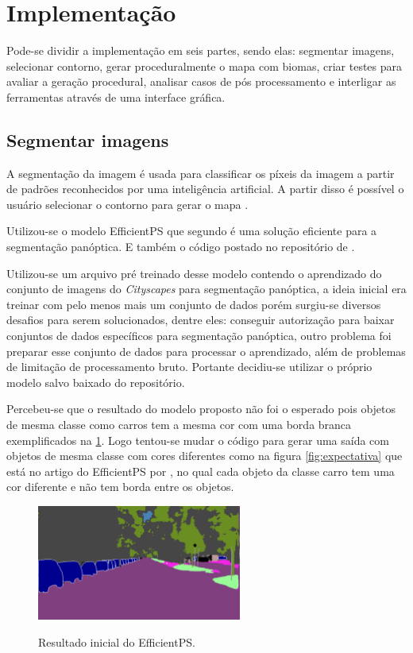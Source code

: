 \section{Implementação}

Pode-se dividir a implementação em seis partes, sendo elas: segmentar imagens, selecionar contorno, gerar proceduralmente o mapa com biomas, criar testes para avaliar a geração procedural, analisar casos de pós processamento e interligar as ferramentas através de uma interface gráfica.

\subsection{Segmentar imagens}

A segmentação da imagem é usada para classificar os píxeis da imagem a partir de padrões reconhecidos por uma inteligência artificial. A partir disso é possível o usuário selecionar o contorno para gerar o mapa \cite{dp_semantic_segmantation, lapix}.

Utilizou-se o modelo EfficientPS que segundo  é uma solução eficiente para a segmentação panóptica. E também o código postado no repositório de .

Utilizou-se um arquivo pré treinado desse modelo contendo o aprendizado do conjunto de imagens do \textit{Cityscapes} para segmentação panóptica, a ideia inicial era treinar com pelo menos mais um conjunto de dados porém surgiu-se diversos desafios para serem solucionados, dentre eles: conseguir autorização para baixar conjuntos de dados específicos para segmentação panóptica, outro problema foi preparar esse conjunto de dados para processar o aprendizado, além de problemas de limitação de processamento bruto. Portante decidiu-se utilizar o próprio modelo salvo baixado do repositório.

Percebeu-se que o resultado do modelo proposto não foi o esperado pois objetos de mesma classe como carros tem a mesma cor com uma borda branca exemplificados na \cref{fig:resultado_inicial}. Logo tentou-se mudar o código para gerar uma saída com objetos de mesma classe com cores diferentes como na figura \cref{fig:expectativa} que está no artigo do EfficientPS por , no qual cada objeto da classe carro tem uma cor diferente e não tem borda entre os objetos.

\begin{figure}[!ht]
	\centering
    \caption{Resultado inicial do EfficientPS.}
	\includegraphics[width=0.6\textwidth]{figures/resultado_primario.png}
	\label{fig:resultado_inicial}
\end{figure}

